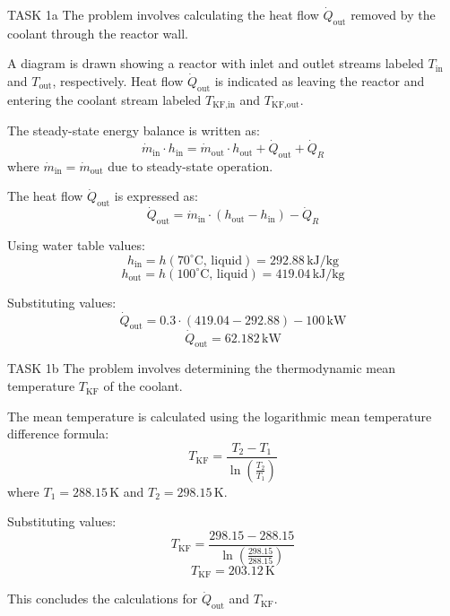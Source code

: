 TASK 1a  
The problem involves calculating the heat flow \( \dot{Q}_{\text{out}} \) removed by the coolant through the reactor wall.  

A diagram is drawn showing a reactor with inlet and outlet streams labeled \( T_{\text{in}} \) and \( T_{\text{out}} \), respectively. Heat flow \( \dot{Q}_{\text{out}} \) is indicated as leaving the reactor and entering the coolant stream labeled \( T_{\text{KF,in}} \) and \( T_{\text{KF,out}} \).  

The steady-state energy balance is written as:  
\[
\dot{m}_{\text{in}} \cdot h_{\text{in}} = \dot{m}_{\text{out}} \cdot h_{\text{out}} + \dot{Q}_{\text{out}} + \dot{Q}_R
\]  
where \( \dot{m}_{\text{in}} = \dot{m}_{\text{out}} \) due to steady-state operation.  

The heat flow \( \dot{Q}_{\text{out}} \) is expressed as:  
\[
\dot{Q}_{\text{out}} = \dot{m}_{\text{in}} \cdot (h_{\text{out}} - h_{\text{in}}) - \dot{Q}_R
\]  

Using water table values:  
\[
h_{\text{in}} = h(70^\circ\text{C, liquid}) = 292.88 \, \text{kJ/kg}
\]  
\[
h_{\text{out}} = h(100^\circ\text{C, liquid}) = 419.04 \, \text{kJ/kg}
\]  

Substituting values:  
\[
\dot{Q}_{\text{out}} = 0.3 \cdot (419.04 - 292.88) - 100 \, \text{kW}
\]  
\[
\dot{Q}_{\text{out}} = 62.182 \, \text{kW}
\]  

TASK 1b  
The problem involves determining the thermodynamic mean temperature \( T_{\text{KF}} \) of the coolant.  

The mean temperature is calculated using the logarithmic mean temperature difference formula:  
\[
T_{\text{KF}} = \frac{T_2 - T_1}{\ln\left(\frac{T_2}{T_1}\right)}
\]  
where \( T_1 = 288.15 \, \text{K} \) and \( T_2 = 298.15 \, \text{K} \).  

Substituting values:  
\[
T_{\text{KF}} = \frac{298.15 - 288.15}{\ln\left(\frac{298.15}{288.15}\right)}
\]  
\[
T_{\text{KF}} = 203.12 \, \text{K}
\]  

This concludes the calculations for \( \dot{Q}_{\text{out}} \) and \( T_{\text{KF}} \).